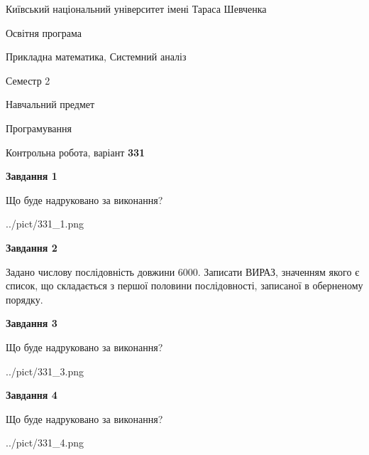 \documentclass[12pt, ukrainian]{article}
\begin{document}
{{\begin {small}\par
{ \center  Київський національний університет імені Тараса Шевченка \par}
{\parbox {5 cm}{Освітня програма \hfill}{\parbox {8 cm}{Прикладна математика, Системний аналіз \hfill}}\parbox {5 cm}{\hfill Семестр 2}}\par
{\parbox {5 cm} {Навчальний предмет \hfill}\parbox {7 cm}{Програмування \hfill}\parbox {6cm}{\hfill}\par}\vspace{-7pt} \end{small}}{\center Контрольна робота, варіант  \No \textbf
{ 331 }\par}}
{
\begin {large}
{\begin {center}\textbf{Завдання 1}\end {center}}\par
Що буде надруковано за виконання?\par\par
\begin{center}
	{../pict/331_1.png}
\end{center}
\newpage

{\begin {center}\textbf{Завдання 2}\end {center}}\par

 Задано числову послідовність  довжини 6000. Записати ВИРАЗ, значенням якого є список, що складається з першої половини послідовності, записаної в оберненому порядку.\par
\newpage

{\begin {center}\textbf{Завдання 3}\end {center}}\par
Що буде надруковано за виконання?\par
\begin{center}
	{../pict/331_3.png}
\end{center}
\newpage

{\begin {center}\textbf{Завдання 4}\end {center}}\par
Що буде надруковано за виконання?\par
\begin{center}
	{../pict/331_4.png}
\end{center}
\newpage


\end{large}}
\end{document}
